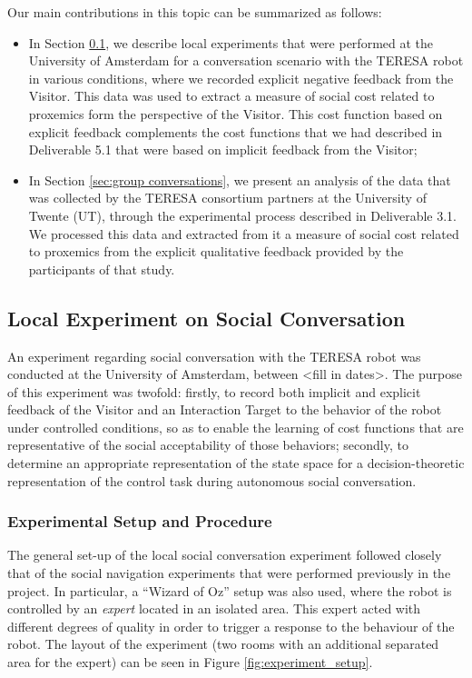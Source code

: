 \documentclass[a4paper,11pt]{report}
\begin{document}
Our main contributions in this topic can be summarized as follows:
\begin{itemize}
\item In Section \ref{sec:initial_experiment}, we describe local experiments that were performed at the University of Amsterdam for a conversation scenario with the TERESA robot in various conditions, where we recorded explicit negative feedback from the Visitor. This data was used to extract a measure of social cost related to proxemics form the perspective of the Visitor. This cost function based on explicit feedback complements the cost functions that we had described in Deliverable 5.1 that were based on implicit feedback from the Visitor;
\item In Section \ref{sec:group conversations}, we present an analysis of the data that was collected by the TERESA consortium partners at the University of Twente (UT), through the experimental process described in Deliverable 3.1. We processed this data and extracted from it a measure of social cost related to proxemics from the explicit qualitative feedback provided by the participants of that study.
\end{itemize}

\subsection{Local Experiment on Social Conversation}
\label{sec:initial_experiment}

An experiment regarding social conversation with the TERESA robot was conducted at the University of Amsterdam, between <fill in dates>. The purpose of this experiment was twofold: firstly, to record both implicit and explicit feedback of the Visitor and an Interaction Target to the behavior of the robot under controlled conditions, so as to enable the learning of cost functions that are representative of the social acceptability of those behaviors; secondly, to determine an appropriate representation of the state space for a decision-theoretic representation of the control task during autonomous social conversation.

\subsubsection{Experimental Setup and Procedure}

The general set-up of the local social conversation experiment followed closely that of the social navigation experiments that were performed previously in the project. In particular, a ``Wizard of Oz'' setup was also used, where the robot is controlled by an \textit{expert} located in an isolated area. This expert acted with different degrees of quality in order to trigger a response to the behaviour of the robot. The layout of the experiment (two rooms with an additional separated area for the expert) can be seen in Figure \ref{fig:experiment_setup}.
\end{document}
